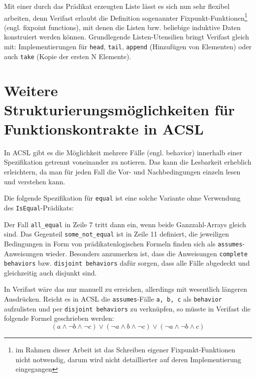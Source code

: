 Mit einer durch das Prädikat erzeugten Liste lässt es sich nun sehr flexibel arbeiten, denn Verifast erlaubt 
die Definition sogenannter Fixpunkt-Funktionen\footnote{im Rahmen dieser Arbeit ist das Schreiben eigener
Fixpunkt-Funktionen nicht notwendig, darum wird nicht detaillierter auf deren Implementierung eingegangen} (engl. fixpoint functions), 
mit denen die Listen bzw. beliebige induktive Daten konstruiert werden können. Grundlegende
Listen-Utensilien bringt Verifast gleich mit: Implementierungen für \lstinline{head}, 
\lstinline{tail}, \lstinline{append} (Hinzufügen von Elementen) oder auch \lstinline{take} 
(Kopie der ersten N Elemente).


\section{Weitere Strukturierungsmöglichkeiten für Funktionskontrakte in ACSL}
\label{sec:design-by-contract:behaviors}

In ACSL gibt es die Möglichkeit mehrere Fälle (engl. behavior) innerhalb einer Spezifikation getrennt voneinander zu
notieren. Das kann die Lesbarkeit erheblich erleichtern, da man für jeden Fall die Vor- und Nachbedingungen
einzeln lesen und verstehen kann.

Die folgende Spezifikation für \texttt{equal} ist eine solche Variante ohne Verwendung des 
\lstinline{IsEqual}-Prädikats:



Der Fall \lstinline{all_equal} in Zeile 7 tritt dann ein, wenn beide Ganzzahl-Arrays gleich sind. Das 
Gegenteil \lstinline{some_not_equal} ist in Zeile 11 definiert, die jeweiligen Bedingungen in Form von
prädikatenlogischen Formeln finden sich als \lstinline{assumes}-Anweisungen wieder. Besonders anzumerken ist,
dass die Anweisungen \lstinline{complete behaviors} bzw. \lstinline{disjoint behaviors} dafür sorgen, dass
alle Fälle abgedeckt und gleichzeitig auch disjunkt sind.

In Verifast wäre das nur manuell zu erreichen, allerdings mit wesentlich längeren Ausdrücken. Reicht 
es in ACSL die \lstinline{assumes}-Fälle \lstinline{a, b, c} als \lstinline{behavior} 
aufzulisten und per \lstinline{disjoint behaviors} zu verknüpfen, so müsste in Verifast die folgende
Formel geschrieben werden:
\[(a \land \neg b \land \neg c) \lor (\neg a \land b \land \neg c) \lor (\neg a \land \neg b \land c)\]

